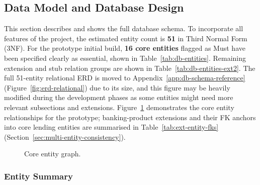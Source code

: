 

\subsection{Data Model and Database Design}
\label{sec:data-model}

This section describes and shows the full database schema. To incorporate all features of the project, the estimated entity count is \textbf{51} in Third Normal Form (3NF). For the prototype initial build, \textbf{16 core entities} flagged as Must have been specified clearly as essential, shown in Table~\ref{tab:db-entities}. Remaining extension and stub relation groups are shown in Table~\ref{tab:db-entities-ext2}. The full 51-entity relational ERD is moved to Appendix~\ref{app:db-schema-reference} (Figure~\ref{fig:erd-relational}) due to its size, and this figure may be heavily modified during the development phases as some entities might need more relevant subsections and extensions. Figure~\ref{fig:core-system-graph} demonstrates the core entity relationships for the prototype; banking-product extensions and their FK anchors into core lending entities are summarised in Table~\ref{tab:ext-entity-fks} (Section~\ref{sec:multi-entity-consistency}).

\begin{figure}[H]
\centering
{}
\caption[Core entity graph]{Core entity graph.}
\label{fig:core-system-graph}
\end{figure}

\subsubsection{Entity Summary}

